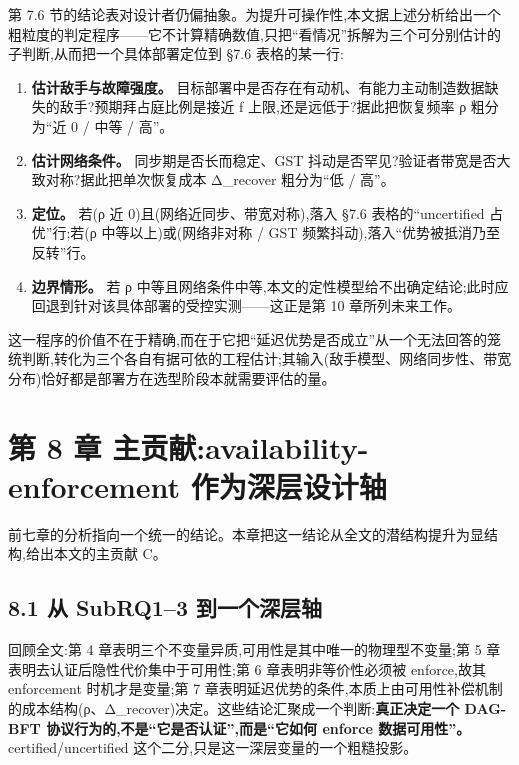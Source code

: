 \documentclass[UTF8,fontset=windows,a4paper,11pt]{ctexart}
\providecommand{\tightlist}{\setlength{\itemsep}{0pt}\setlength{\parskip}{0pt}}
\begin{document}
第 7.6
节的结论表对设计者仍偏抽象。为提升可操作性,本文据上述分析给出一个粗粒度的判定程序------它不计算精确数值,只把``看情况''拆解为三个可分别估计的子判断,从而把一个具体部署定位到
§7.6 表格的某一行:

\begin{enumerate}
\def\labelenumi{\arabic{enumi}.}
\tightlist
\item
  \textbf{估计敌手与故障强度。}
  目标部署中是否存在有动机、有能力主动制造数据缺失的敌手?预期拜占庭比例是接近
  f 上限,还是远低于?据此把恢复频率 ρ 粗分为``近 0 / 中等 / 高''。
\item
  \textbf{估计网络条件。} 同步期是否长而稳定、GST
  抖动是否罕见?验证者带宽是否大致对称?据此把单次恢复成本 Δ\_recover
  粗分为``低 / 高''。
\item
  \textbf{定位。} 若(ρ 近 0)且(网络近同步、带宽对称),落入 §7.6
  表格的``uncertified 占优''行;若(ρ 中等以上)或(网络非对称 / GST
  频繁抖动),落入``优势被抵消乃至反转''行。
\item
  \textbf{边界情形。} 若 ρ
  中等且网络条件中等,本文的定性模型给不出确定结论;此时应回退到针对该具体部署的受控实测------这正是第
  10 章所列未来工作。
\end{enumerate}

这一程序的价值不在于精确,而在于它把``延迟优势是否成立''从一个无法回答的笼统判断,转化为三个各自有据可依的工程估计;其输入(敌手模型、网络同步性、带宽分布)恰好都是部署方在选型阶段本就需要评估的量。

\section{第 8 章 主贡献:availability-enforcement
作为深层设计轴}\label{ux7b2c-8-ux7ae0-ux4e3bux8d21ux732eavailability-enforcement-ux4f5cux4e3aux6df1ux5c42ux8bbeux8ba1ux8f74}

前七章的分析指向一个统一的结论。本章把这一结论从全文的潜结构提升为显结构,给出本文的主贡献
C。

\subsection{8.1 从 SubRQ1--3
到一个深层轴}\label{ux4ece-subrq13-ux5230ux4e00ux4e2aux6df1ux5c42ux8f74}

回顾全文:第 4 章表明三个不变量异质,可用性是其中唯一的物理型不变量;第 5
章表明去认证后隐性代价集中于可用性;第 6 章表明非等价性必须被
enforce,故其 enforcement 时机才是变量;第 7
章表明延迟优势的条件,本质上由可用性补偿机制的成本结构(ρ、Δ\_recover)决定。这些结论汇聚成一个判断:\textbf{真正决定一个
DAG-BFT 协议行为的,不是``它是否认证'',而是``它如何 enforce
数据可用性''。} certified/uncertified
这个二分,只是这一深层变量的一个粗糙投影。
\end{document}

